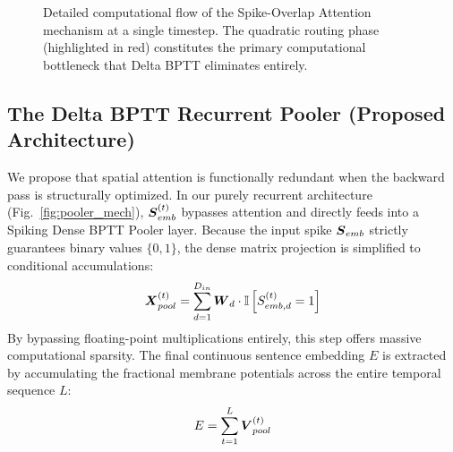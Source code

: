 \documentclass[runningheads]{llncs}
\begin{document}
\begin{figure}[t]
{%
}
\caption{Detailed computational flow of the Spike-Overlap Attention mechanism at a single timestep. The quadratic routing phase (highlighted in red) constitutes the primary computational bottleneck that Delta BPTT eliminates entirely.}
\label{fig:attention_mech}
\end{figure}

\subsection{The Delta BPTT Recurrent Pooler (Proposed Architecture)}
We propose that spatial attention is functionally redundant when the backward pass is structurally optimized. In our purely recurrent architecture (Fig.~\ref{fig:pooler_mech}), $\boldsymbol{S}_{emb}^{(t)}$ bypasses attention and directly feeds into a Spiking Dense BPTT Pooler layer. Because the input spike $\boldsymbol{S}_{emb}$ strictly guarantees binary values $\{0, 1\}$, the dense matrix projection is simplified to conditional accumulations:
\begin{equation}
\boldsymbol{X}_{pool}^{(t)} = \sum_{d=1}^{D_{in}} \boldsymbol{W}_{d} \cdot \mathbb{I}\left[ S_{emb, d}^{(t)} = 1 \right]
\end{equation}
By bypassing floating-point multiplications entirely, this step offers massive computational sparsity. The final continuous sentence embedding $E$ is extracted by accumulating the fractional membrane potentials across the entire temporal sequence $L$:
\begin{equation}
E = \sum_{t=1}^L \boldsymbol{V}_{pool}^{(t)}
\end{equation}
\end{document}

